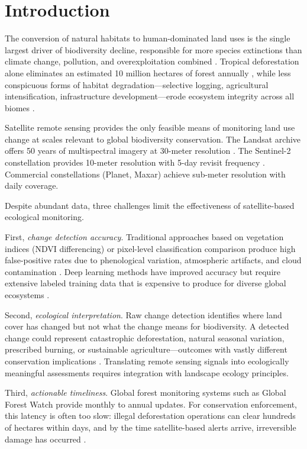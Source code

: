 \section{Introduction}

\label{sec:introduction}

The conversion of natural habitats to human-dominated land uses is the single largest driver of biodiversity decline, responsible for more species extinctions than climate change, pollution, and overexploitation combined \citep{maxwell2016biodiversity}.
Tropical deforestation alone eliminates an estimated 10 million hectares of forest annually \citep{fao2020global}, while less conspicuous forms of habitat degradation---selective logging, agricultural intensification, infrastructure development---erode ecosystem integrity across all biomes \citep{watson2018decline}.

Satellite remote sensing provides the only feasible means of monitoring land use change at scales relevant to global biodiversity conservation.
The Landsat archive offers 50 years of multispectral imagery at 30-meter resolution \citep{wulder2019current}.
The Sentinel-2 constellation provides 10-meter resolution with 5-day revisit frequency \citep{drusch2012sentinel}.
Commercial constellations (Planet, Maxar) achieve sub-meter resolution with daily coverage.

Despite abundant data, three challenges limit the effectiveness of satellite-based ecological monitoring.

First, \emph{change detection accuracy}.
Traditional approaches based on vegetation indices (NDVI differencing) or pixel-level classification comparison produce high false-positive rates due to phenological variation, atmospheric artifacts, and cloud contamination \citep{zhu2017change}.
Deep learning methods have improved accuracy but require extensive labeled training data that is expensive to produce for diverse global ecosystems \citep{yuan2021deep}.

Second, \emph{ecological interpretation}.
Raw change detection identifies where land cover has changed but not what the change means for biodiversity.
A detected change could represent catastrophic deforestation, natural seasonal variation, prescribed burning, or sustainable agriculture---outcomes with vastly different conservation implications \citep{redford2003empty}.
Translating remote sensing signals into ecologically meaningful assessments requires integration with landscape ecology principles.

Third, \emph{actionable timeliness}.
Global forest monitoring systems such as Global Forest Watch \citep{hansen2013high} provide monthly to annual updates.
For conservation enforcement, this latency is often too slow: illegal deforestation operations can clear hundreds of hectares within days, and by the time satellite-based alerts arrive, irreversible damage has occurred \citep{finer2018combating}.

